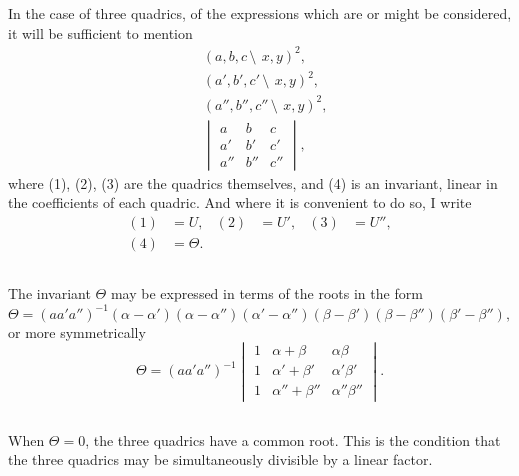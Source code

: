 \documentclass[11pt,a4paper]{book}
\begin{document}
\begin{center}
In the case of three quadrics, of the expressions which are or might be considered, it will be sufficient to mention
\begin{align}
&(a, b, c\,\setminus\!\!\:\, x, y)^2, \tag{1}\\
&(a', b', c'\,\setminus\!\!\:\, x, y)^2, \tag{2}\\
&(a'', b'', c''\,\setminus\!\!\:\, x, y)^2, \tag{3}\\
&\begin{vmatrix}
a & b & c \\
a' & b' & c' \\
a'' & b'' & c''
\end{vmatrix}, \tag{4}
\end{align}
where (1), (2), (3) are the quadrics themselves, and (4) is an invariant, linear in the coefficients of each quadric. And where it is convenient to do so, I write
\begin{align*}
(1) &= U, & (2) &= U', & (3) &= U'',\\
(4) &= \Theta.
\end{align*}

\subsection{}

The invariant $\Theta$ may be expressed in terms of the roots in the form
\[
\Theta = (aa'a'')^{-1}(\alpha - \alpha')(\alpha - \alpha'')(\alpha' - \alpha'')(\beta - \beta')(\beta - \beta'')(\beta' - \beta''),
\]
or more symmetrically
\[
\Theta = (aa'a'')^{-1}
\begin{vmatrix}
1 & \alpha + \beta & \alpha\beta \\
1 & \alpha' + \beta' & \alpha'\beta' \\
1 & \alpha'' + \beta'' & \alpha''\beta''
\end{vmatrix}.
\]

\subsection{}

When $\Theta = 0$, the three quadrics have a common root. This is the condition that the three quadrics may be simultaneously divisible by a linear factor.

\subsection{}


\end{center}
\end{document}
